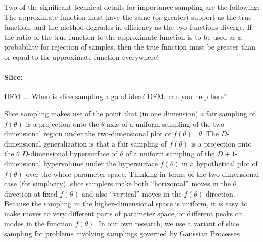 \documentclass[modern]{aastex61}
\newcommand{\pars}{\theta}
\begin{document}
Two of the significant technical details for importance sampling are the
following:
The approximate function must have the same (or greater) support as
the true function, and the method degrades in efficiency as the two
functions diverge.
If the ratio of the true function to the approximate function is to be
used as a probability for rejection of samples, then the true function
must be greater than or equal to the approximate function everywhere!

\paragraph{Slice:}
DFM ... When is slice sampling a good idea?  DFM, can you help here?

Slice sampling makes use of the point that (in one dimension) a fair
sampling of $f(\pars)$ is a projection onto the $\pars$ axis of a
uniform sampling of the two-dimensional region under the
two-dimensional plot of $f(\pars)$ \vs\ $\pars$.
The $D$-dimensional generalization is that a fair sampling of
$f(\pars)$ is a projection onto the $\pars$ $D$-dimensional
hypersurface of $\pars$ of a uniform sampling of the $D+1$-dimensional
hypervolume under the hypersurface $f(\pars)$ in a hypothetical plot
of $f(\pars)$ over the whole parameter space.
Thinking in terms of the two-dimensional case (for simplicity), slice
samplers make both ``horizontal'' moves in the $\pars$ direction at
fixed $f(\pars)$ and also ``vertical'' moves in the $f(\pars)$
direction.
Because the sampling in the higher-dimensional space is uniform, it is
easy to make moves to very different parts of parameter space, or
different peaks or modes in the function $f(\pars)$.
In our own research, we use a variant of slice sampling for problems
involving samplings governed by Gaussian Processes.
\end{document}
